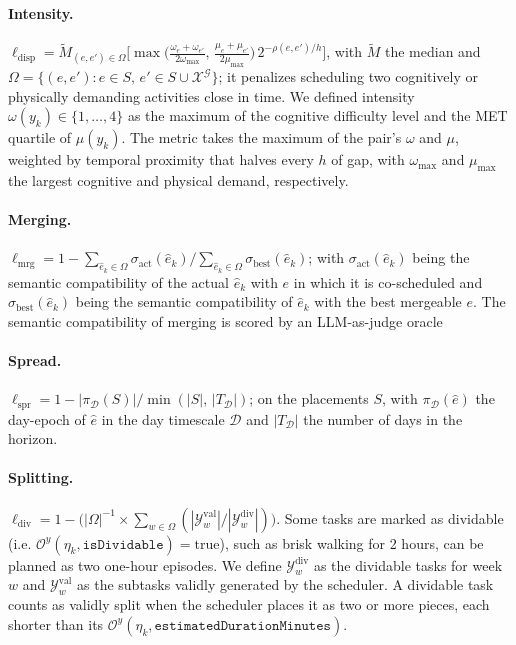 \documentclass[runningheads]{llncs}
\begin{document}
\paragraph{Intensity.} $\ell_{\mathrm{disp}} = \tilde{M}_{(e,e')\in\Omega}\bigl[\max\bigl(\frac{\omega_e+\omega_{e'}}{2\omega_{\max}},\,\frac{\mu_e+\mu_{e'}}{2\mu_{\max}}\bigr)\,2^{-\rho(e,e')/h}\bigr]$, with $\tilde{M}$ the median and $\Omega=\{(e,e'):e\in S,\,e'\in S\cup\mathcal{X}^{\mathcal{G}}\}$; it penalizes scheduling two cognitively or physically demanding activities close in time. We defined intensity $\omega(y_k)\in\{1,\dots,4\}$ as the maximum of the cognitive difficulty level and the MET quartile of $\mu(y_k)$. The metric takes the maximum of the pair's $\omega$ and $\mu$, weighted by temporal proximity that halves every $h$ of gap, with $\omega_{\max}$ and $\mu_{\max}$ the largest cognitive and physical demand, respectively.

\paragraph{Merging.} $\ell_{\mathrm{mrg}} = 1-\sum_{\hat{e}_k\in\Omega}\sigma_{\mathrm{act}}(\hat{e}_k)/\sum_{\hat{e}_k\in\Omega}\sigma_{\mathrm{best}}(\hat{e}_k)$; with $\sigma_{\mathrm{act}}(\hat{e}_k)$ being the semantic compatibility of the actual $\hat{e}_k$ with $e$ in which it is co-scheduled and $\sigma_{\mathrm{best}}(\hat{e}_k)$ being the semantic compatibility of $\hat{e}_k$ with the best mergeable $e$. The semantic compatibility of merging is scored by an LLM-as-judge oracle \citep{Zheng2023}

\paragraph{Spread.} $\ell_{\mathrm{spr}} = 1-{|\pi_{\mathcal{D}}(S)|}/{\min(|S|,\,|T_{\mathcal{D}}|)}$; on the placements $S$, with $\pi_{\mathcal{D}}(\hat{e})$ the day-epoch of $\hat{e}$ in the day timescale $\mathcal{D}$ and $|T_{\mathcal{D}}|$ the number of days in the horizon.

\paragraph{Splitting.} $\ell_{\mathrm{div}} = 1-\bigl(|\Omega|^{-1}\times\sum_{w\in\Omega}({|\mathcal{Y}^{\mathrm{val}}_w|}/{|\mathcal{Y}^{\mathrm{div}}_w|})\bigr)$. Some tasks are marked as dividable (i.e. $\mathcal{O}^{y}(\eta_k,\texttt{isDividable})=\mathrm{true}$), such as brisk walking for 2 hours, can be planned as two one-hour episodes. 
We define $\mathcal{Y}^{\mathrm{div}}_w$ as the dividable tasks for week $w$ and $\mathcal{Y}^{\mathrm{val}}_w$ as the subtasks validly generated by the scheduler. A dividable task counts as validly split when the scheduler places it as two or more
pieces, each shorter than its $\mathcal{O}^{y}(\eta_k,\texttt{estimatedDurationMinutes})$.
\end{document}
